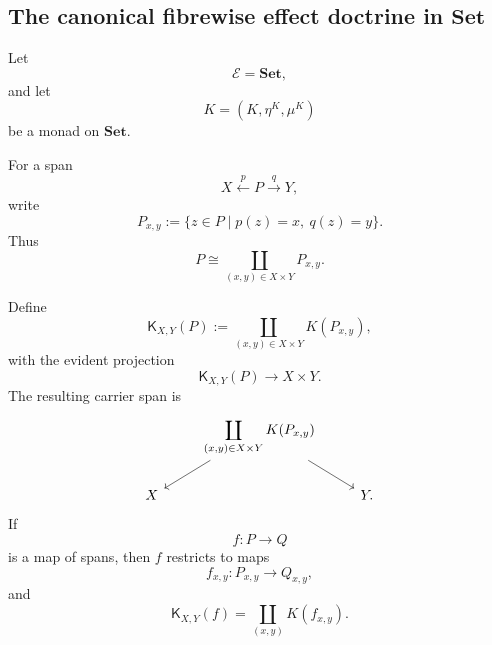 \subsection{The canonical fibrewise effect doctrine in
\texorpdfstring{\(\mathbf{Set}\)}{Set}}
\label{subsec:fibrewise-effects-set}

Let
\[
    \mathcal E=\mathbf{Set},
\]
and let
\[
    K=(K,\eta^K,\mu^K)
\]
be a monad on \(\mathbf{Set}\).

For a span
\[
    X\xleftarrow{p}P\xrightarrow{q}Y,
\]
write
\[
    P_{x,y}
    :=
    \{z\in P\mid p(z)=x,\ q(z)=y\}.
\]
Thus
\[
    P
    \cong
    \coprod_{(x,y)\in X\times Y}P_{x,y}.
\]

Define
\[
    \mathsf K_{X,Y}(P)
    :=
    \coprod_{(x,y)\in X\times Y}K(P_{x,y}),
\]
with the evident projection
\[
    \mathsf K_{X,Y}(P)\to X\times Y.
\]
The resulting carrier span is
\[
    \begin{tikzcd}
        &
            \displaystyle
            \coprod_{(x,y)\in X\times Y}K(P_{x,y})
                \arrow[dl]
                \arrow[dr]
        &
        \\
            X
        &
        &
            Y.
    \end{tikzcd}
\]
If
\[
    f:P\to Q
\]
is a map of spans, then \(f\) restricts to maps
\[
    f_{x,y}:P_{x,y}\to Q_{x,y},
\]
and
\[
    \mathsf K_{X,Y}(f)
    =
    \coprod_{(x,y)}
    K(f_{x,y}).
\]

